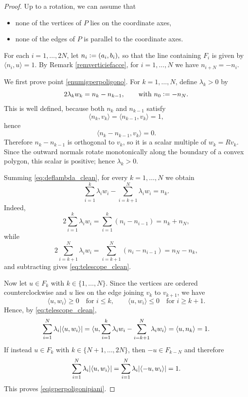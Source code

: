 \documentclass{article}
\numberwithin{equation}{section}
\theoremstyle{plain}%
\theoremstyle{definition}
\theoremstyle{definition}
\DeclarePairedDelimiter{\valass}{\lvert}{\rvert} %
\newcommand{\prodscal}[2]{\langle{#1} , {#2} \rangle}
\begin{document}
\begin{proof}
Up to a rotation, we can assume that
\begin{itemize}
    \item none of the vertices of $P$ lies on the coordinate axes,
    \item none of the edges of $P$ is parallel to the coordinate axes.
\end{itemize}
For each $i=1,\dots,2N$, let
$n_i \vcentcolon = (a_i,b_i),$
so that the line containing $F_i$ is given by
$\prodscal{n_i}{u}=1.
$
By Remark \ref{remverticiefacce}, for $i=1,\dots,N$ we have
$n_{i+N}=-n_i$.

We first prove point \ref{enumigperpoligono}. For $k=1,\dots,N$, define $\lambda_k>0$ by
\begin{equation}\label{eq:deflambda_clean}
2\lambda_k w_k = n_k-n_{k-1},
\qquad\text{with }n_0\vcentcolon=-n_N.
\end{equation}
This is well defined, because both $n_k$ and $n_{k-1}$ satisfy
$$
\prodscal{n_k}{v_k}=\prodscal{n_{k-1}}{v_k}=1,
$$
hence
$$
\prodscal{n_k-n_{k-1}}{v_k}=0.
$$
Therefore $n_k-n_{k-1}$ is orthogonal to $v_k$, so it is a scalar multiple of
$w_k=Rv_k$.
Since the outward normals rotate monotonically along the boundary of a convex polygon, this scalar is positive; hence $\lambda_k>0$.

Summing \eqref{eq:deflambda_clean}, for every $k=1,\dots,N$ we obtain
\begin{equation}\label{eq:telescope_clean}
\sum_{i=1}^{k}\lambda_iw_i-\sum_{i=k+1}^{N}\lambda_iw_i=n_k.
\end{equation}
Indeed,
$$
2\sum_{i=1}^{k}\lambda_iw_i=\sum_{i=1}^{k}(n_i-n_{i-1})=n_k+n_N,
$$
while
$$
2\sum_{i=k+1}^{N}\lambda_iw_i=\sum_{i=k+1}^{N}(n_i-n_{i-1})=n_N-n_k,
$$
and subtracting gives \eqref{eq:telescope_clean}.

Now let $u\in F_k$ with $k\in\{1,\dots,N\}$. Since the vertices are ordered counterclockwise and $u$ lies on the edge joining $v_k$ to $v_{k+1}$, we have
$$
\prodscal{u}{w_i}\ge 0 \quad \text{for } i\le k,
\qquad
\prodscal{u}{w_i}\le 0 \quad \text{for } i\ge k+1.
$$
Hence, by \eqref{eq:telescope_clean},
$$
\sum_{i=1}^{N}\lambda_i\valass{\prodscal{u}{w_i}}
=
\prodscal{u}{\sum_{i=1}^{k}\lambda_iw_i-\sum_{i=k+1}^{N}\lambda_iw_i}
=
\prodscal{u}{n_k}
=1.
$$
If instead $u\in F_{k}$ with $k\in\{N+1,\dots,2N\}$, then $-u\in F_{k-N}$ and therefore
$$
\sum_{i=1}^{N}\lambda_i\valass{\prodscal{u}{w_i}}
=
\sum_{i=1}^{N}\lambda_i\valass{\prodscal{-u}{w_i}}
=1.
$$
This proves \eqref{eqigperpoligonipiani}.


\end{proof}
\end{document}
